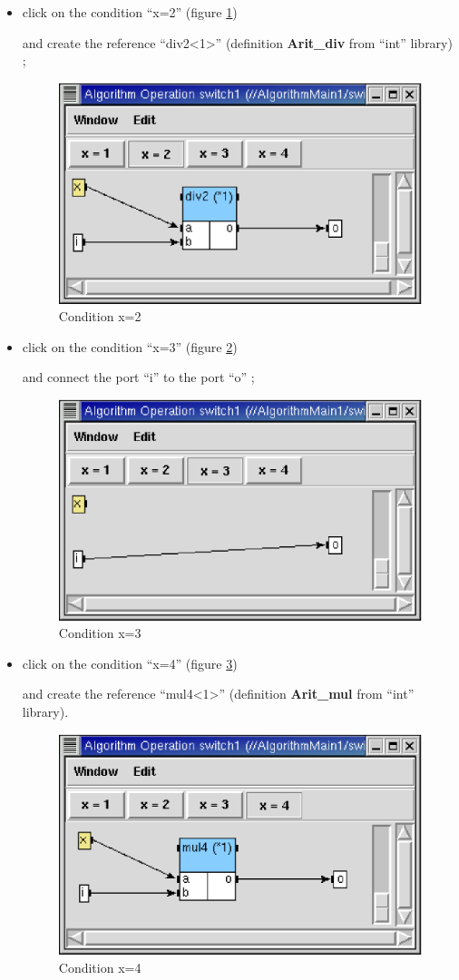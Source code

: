 \documentclass[a4paper,twoside]{report}
\begin{document}
\begin{itemize}
\begin{itemize}
\begin{itemize}
\item click on the condition ``x=2'' (figure \ref{condition2})

and create the reference ``div2<1>'' (definition \textbf{Arit\_div} from
``int'' library) ;

\begin{figure}[htbp]
  \begin{center} 
        \includegraphics[width=0.5\linewidth]{Condition2.eps} 
  \end{center}
  \caption{Condition x=2}
  \label{condition2}
\end{figure}

\item click on the condition ``x=3'' (figure \ref{condition3}) 

and connect the port ``i'' to the port ``o'' ;

\begin{figure}[htbp]
  \begin{center} 
        \includegraphics[width=0.5\linewidth]{Condition3.eps} 
  \end{center}
  \caption{Condition x=3}
  \label{condition3}
\end{figure}

\item click on the condition ``x=4'' (figure \ref{condition4}) 

and create the reference ``mul4<1>'' (definition \textbf{Arit\_mul} from ``int'' library).

\begin{figure}[htbp]
  \begin{center} 
        \includegraphics[width=0.5\linewidth]{Condition4.eps} 
  \end{center}
  \caption{Condition x=4}
  \label{condition4}
\end{figure}


\end{itemize}
\end{itemize}
\end{itemize}
\end{document}
